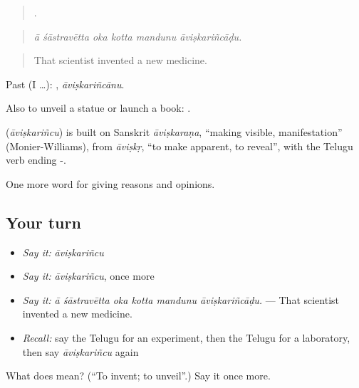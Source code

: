 \begin{quote}
     .
\end{quote}

\begin{quote}
\emph{ā śāstravētta oka kotta mandunu āviṣkariñcāḍu.}
\end{quote}

\begin{quote}
That scientist invented a new medicine.
\end{quote}

Past (I …): , \emph{āviṣkariñcānu}.

Also to unveil a statue or launch a book:  .

\begin{cousinweb}
\textbf{} (\emph{āviṣkariñcu}) is built on Sanskrit \emph{āviṣkaraṇa}, \textquotedblleft{}making visible, manifestation\textquotedblright{} (Monier-Williams), from \emph{āviṣkṛ}, \textquotedblleft{}to make apparent, to reveal\textquotedblright{}, with the Telugu verb ending -.
\end{cousinweb}

\begin{grammarlens}[title={What you've built}]
One more word for giving reasons and opinions.
\end{grammarlens}

\subsection*{Your turn}
\begin{itemize}
\raggedright
  \item \emph{Say it:} \emph{āviṣkariñcu}
  \item \emph{Say it:} \emph{āviṣkariñcu}, once more
  \item \emph{Say it:} \emph{ā śāstravētta oka kotta mandunu āviṣkariñcāḍu.} — That scientist invented a new medicine.
  \item \emph{Recall:} say the Telugu for an experiment, then the Telugu for a laboratory, then say \emph{āviṣkariñcu} again
\end{itemize}

\begin{tcolorbox}[breakable,colback=teal!4,colframe=teal!35!black,title={Before you move on}]
What does  mean? (\textquotedblleft{}To invent; to unveil\textquotedblright{}.) Say it once more.
\end{tcolorbox}
